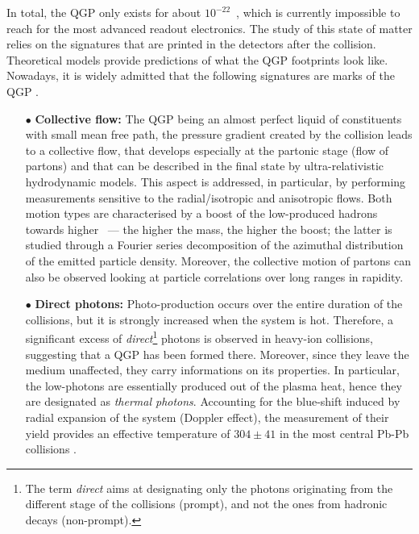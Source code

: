 In total, the QGP only exists for about $10^{-22}$~\second, which is currently impossible to reach for the most advanced readout electronics. The study of this state of matter relies on the signatures that are printed in the detectors after the collision. Theoretical models provide predictions of what the QGP footprints look like. Nowadays, it is widely admitted that the following signatures are marks of the QGP \cite{alicecollaborationALICEExperimentJourney2022}.

\begin{itemize}
\item[$\bullet$] \textbf{Collective flow:} The QGP being an almost perfect liquid of constituents with small mean free path, the pressure gradient created by the collision leads to a collective flow, that develops especially at the partonic stage (flow of partons) and that can be described in the final state by ultra-relativistic hydrodynamic models. This aspect is addressed, in particular, by performing measurements sensitive to the radial/isotropic and anisotropic flows. Both motion types are characterised by a boost of the low-\pT produced hadrons towards higher \pT\ --- the higher the mass, the higher the boost; the latter is studied through a Fourier series decomposition of the azimuthal distribution of the emitted particle density. Moreover, the collective motion of partons can also be observed looking at particle correlations over long ranges in rapidity.

\item[$\bullet$] \textbf{Direct photons:} Photo-production occurs over the entire duration of the collisions, but it is strongly increased when the system is hot. Therefore, a significant excess of \textit{direct}\footnote{The term \textit{direct} aims at designating only the photons originating from the different stage of the collisions (prompt), and not the ones from hadronic decays (non-prompt).} photons is observed in heavy-ion collisions, suggesting that a QGP has been formed there. Moreover, since they leave the medium unaffected, they carry informations on its properties. In particular, the low-\pT photons are essentially produced out of the plasma heat, hence they are designated as \textit{thermal photons}. Accounting for the blue-shift induced by radial expansion of the system (Doppler effect), the measurement of their yield provides an effective temperature of $304 \pm 41$ \mev in the most central Pb-Pb collisions \cite{alicecollaborationALICEExperimentJourney2022}.


\end{itemize}
